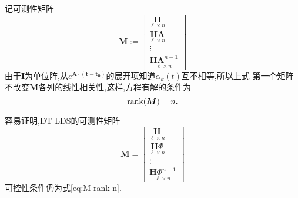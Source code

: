 \documentclass[cn,10pt,citestyle=gb7714-2015,bibstyle=gb7714-2015]{elegantbook}
\newcommand{\rank}{\textup{rank}}
\begin{document}
记可测性矩阵
\begin{equation}
  \bm{M}:=\begin{bmatrix}
    \underset{\ell\times n}{\bm{H}}\\
    \underset{\ell\times n}{\bm{H}\bm{A}}\\
    \vdots\\
    \underset{\ell\times n}{\bm{H}\bm{A}^{n-1}}
  \end{bmatrix}
\end{equation}
由于$\bm{I}$为单位阵,从$e^{\bm{A\cdot(t-t_0)}}$的展开项知道$\alpha_k(t)$互不相等,所以上式
第一个矩阵不改变$\bm{M}$各列的线性相关性,这样,方程有解的条件为
\begin{equation}\label{eq:M-rank-n}
  \rank(\bm{M})=n.
\end{equation}

容易证明,DT LDS的可测性矩阵
\begin{equation}
  \bm{M}=\begin{bmatrix}
    \underset{\ell\times n}{\bm{H}}\\
    \underset{\ell\times n}{\bm{H}\bm{\varPhi}}\\
    \vdots\\
    \underset{\ell\times n}{\bm{H}\bm{\varPhi}^{n-1}}
  \end{bmatrix}
\end{equation}
可控性条件仍为式\eqref{eq:M-rank-n}.
\end{document}
